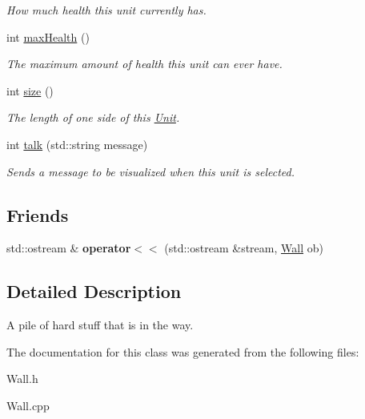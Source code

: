 \begin{DoxyCompactItemize}
\begin{DoxyCompactList}\small\item\em How much health this unit currently has. \item\end{DoxyCompactList}\item 
\hypertarget{classWall_ae5056228f0844e7a878ba730a11c0752}{
int \hyperlink{classWall_ae5056228f0844e7a878ba730a11c0752}{maxHealth} ()}
\label{classWall_ae5056228f0844e7a878ba730a11c0752}

\begin{DoxyCompactList}\small\item\em The maximum amount of health this unit can ever have. \item\end{DoxyCompactList}\item 
\hypertarget{classWall_a85e64eb011f3058640744958a3850c84}{
int \hyperlink{classWall_a85e64eb011f3058640744958a3850c84}{size} ()}
\label{classWall_a85e64eb011f3058640744958a3850c84}

\begin{DoxyCompactList}\small\item\em The length of one side of this \hyperlink{classUnit}{Unit}. \item\end{DoxyCompactList}\item 
\hypertarget{classWall_a714a3c6c90eb9abbfc01929c27c5bd7f}{
int \hyperlink{classWall_a714a3c6c90eb9abbfc01929c27c5bd7f}{talk} (std::string message)}
\label{classWall_a714a3c6c90eb9abbfc01929c27c5bd7f}

\begin{DoxyCompactList}\small\item\em Sends a message to be visualized when this unit is selected. \item\end{DoxyCompactList}\end{DoxyCompactItemize}
\subsection*{Friends}
\begin{DoxyCompactItemize}
\item 
\hypertarget{classWall_a0928c598df6be526ec9fadcc9a528d37}{
std::ostream \& {\bfseries operator$<$$<$} (std::ostream \&stream, \hyperlink{classWall}{Wall} ob)}
\label{classWall_a0928c598df6be526ec9fadcc9a528d37}

\end{DoxyCompactItemize}


\subsection{Detailed Description}
A pile of hard stuff that is in the way. 

The documentation for this class was generated from the following files:\begin{DoxyCompactItemize}
\item 
Wall.h\item 
Wall.cpp\end{DoxyCompactItemize}
